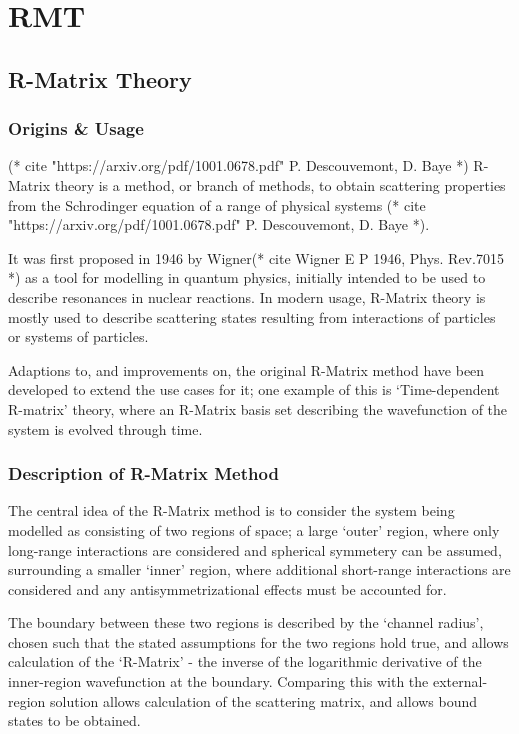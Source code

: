 
\chapter{RMT} %

\label{Chapter5} %

\section{R-Matrix Theory}
\subsection{Origins \& Usage}
(* cite "https://arxiv.org/pdf/1001.0678.pdf" P. Descouvemont, D. Baye *)
R-Matrix theory is a method, or branch of methods, to obtain scattering properties from the Schrodinger equation of a range of physical systems (* cite "https://arxiv.org/pdf/1001.0678.pdf" P. Descouvemont, D. Baye *). 

It was first proposed in 1946 by Wigner(* cite Wigner E P 1946, Phys. Rev.7015 *) as a tool for modelling in quantum physics, initially intended to be used to describe resonances in nuclear reactions. In modern usage, R-Matrix theory is mostly used to describe scattering states resulting from interactions of particles or systems of particles. 

Adaptions to, and improvements on, the original R-Matrix method have been developed to extend the use cases for it; one example of this is `Time-dependent R-matrix' theory, where an R-Matrix basis set describing the wavefunction of the system is evolved through time. 

\subsection{Description of R-Matrix Method}
The central idea of the R-Matrix method is to consider the system being modelled as consisting of two regions of space; a large `outer' region, where only long-range interactions are considered and spherical symmetery can be assumed, surrounding a smaller `inner' region, where additional short-range interactions are considered and any antisymmetrizational effects must be accounted for. 

The boundary between these two regions is described by the `channel radius', chosen such that the stated assumptions for the two regions hold true, and allows calculation of the `R-Matrix' - the inverse of the logarithmic derivative of the inner-region wavefunction at the boundary. Comparing this with the external-region solution allows calculation of the scattering matrix, and allows bound states to be obtained.

